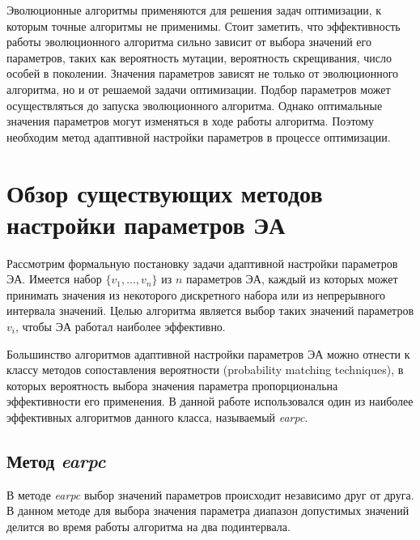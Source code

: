 Эволюционные алгоритмы применяются для решения задач оптимизации, к которым точные алгоритмы не применимы. Стоит заметить, что эффективность работы эволюционного алгоритма сильно зависит от выбора значений его параметров, таких как вероятность мутации, вероятность скрещивания, число особей в поколении. Значения параметров зависят не только от эволюционного алгоритма, но и от решаемой задачи оптимизации. Подбор параметров может осуществляться до запуска эволюционного алгоритма. Однако оптимальные значения параметров могут изменяться в ходе работы алгоритма. Поэтому необходим метод адаптивной настройки параметров в процессе оптимизации.

\section{Обзор существующих методов настройки параметров ЭА}

Рассмотрим формальную постановку задачи адаптивной настройки параметров ЭА. Имеется набор $\{v_1, ..., v_n\}$ из $n$ параметров ЭА, каждый из которых может принимать значения из некоторого дискретного набора или из непрерывного интервала значений. Целью алгоритма является выбор таких значений параметров $v_i$, чтобы ЭА работал наиболее эффективно.

Большинство алгоритмов адаптивной настройки параметров ЭА можно отнести к классу методов сопоставления  вероятности (probability matching techniques), в которых вероятность выбора значения параметра пропорциональна эффективности его применения. В данной работе использовался один из наиболее эффективных алгоритмов данного класса, называемый \textit{earpc}.

\subsection{Метод \textit{earpc}}
\label{earpc}
В методе \textit{earpc} выбор значений параметров происходит независимо друг от друга. В данном методе для выбора значения параметра диапазон допустимых значений делится во время работы алгоритма на два подинтервала.

